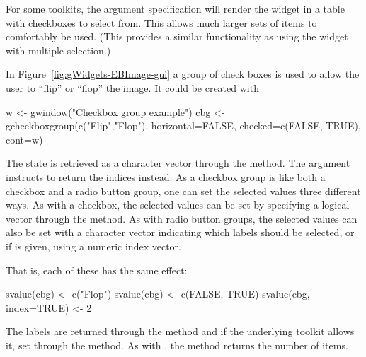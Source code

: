 For some toolkits, the argument specification 
will render the widget in a table with checkboxes to select from. This
allows much larger sets of items to comfortably be used. (This provides
a similar functionality as using the  widget with
multiple selection.)


In Figure~\ref{fig:gWidgets-EBImage-gui} a group of check boxes is
used to allow the user to ``flip'' or ``flop'' the image. It could be
created with

\begin{Schunk}
\begin{Sinput}
 w <- gwindow("Checkbox group example")
 cbg <- gcheckboxgroup(c("Flip","Flop"), horizontal=FALSE, 
                       checked=c(FALSE, TRUE), cont=w)
\end{Sinput}
\end{Schunk}
%


The state is retrieved as a character vector through the
 method. The  argument
instructs  to return the indices instead. As a
checkbox group is like both a checkbox and a radio button group, one
can set the selected values three different ways. As with a checkbox, 
the selected values can be set by specifying a logical vector through the
 method. As with radio button groups,
the selected values can also be set with a character vector indicating
which labels should be selected, or if  is given,
using a numeric index vector.


That is, each of these has the same effect:
\begin{Schunk}
\begin{Sinput}
 svalue(cbg) <- c("Flop")
 svalue(cbg) <- c(FALSE, TRUE)
 svalue(cbg, index=TRUE) <- 2
\end{Sinput}
\end{Schunk}

The labels are returned through the \method{[}{gcheckboxgroup} method
and if the underlying toolkit allows it, set through the
\method{[\ASSIGN}{gcheckboxgroup} method. As with ,
the  method returns the number of items.



